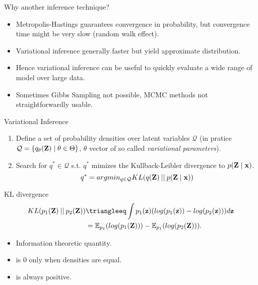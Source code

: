 \documentclass{beamer}
\newcommand{\mmid}{\mathbin{{\mid}{\mid}}}
\begin{document}
\begin{frame}{Why another inference technique?}
  \begin{itemize}
  \item Metropolis-Hastings guarantees convergence in probability, but convergence time might be very slow (random walk effect).
  \item Variational inference generally faster but yield approximate distribution.
  \item Hence variational inference can be useful to quickly evaluate a wide range of model over large data.
  \item Sometimes Gibbs Sampling not possible, MCMC methods not straightforwardly usable. 
  \end{itemize}
\end{frame}

\begin{frame}{Variational Inference}
  \begin{enumerate}
  \item Define a set of probability densities over latent variables $\mathcal{Q}$ (in pratice $\mathcal{Q} = \{ q_{\theta}({\bf Z}) \mid \theta \in \Theta\}$, $\theta$ vector of so called \emph{variational parameters}).
  \item Search for $q^* \in \mathcal{Q}$ s.t. $q^*$ mimizes the Kullback-Leibler divergence to $p({\bf Z} \mid {\bf x})$.
    \[q^* = argmin_{q \in \mathcal{Q}} KL(q({\bf Z}) \mmid p({\bf Z} \mid {\bf x}) )\]
  \end{enumerate}
  \begin{block}{KL divergence}
    \[
    \begin{aligned}
      KL(p_1({\bf Z}) \mmid p_2({\bf Z})) &\triangleeq \int p_1({\bf z}) (log(p_1({\bf z})) - log(p_2({\bf z}))) d{\bf z}\\
      &= \mathbb{E}_{p_1}(log(p_1({\bf Z}))) - \mathbb{E}_{p_1}(log(p_2({\bf Z}))).
    \end{aligned}
    \]
    \begin{itemize}
    \item Information theoretic quantity.
    \item is $0$ only when densities are equal.
    \item is always positive.
    \end{itemize}
  \end{block}
\end{frame}
\end{document}

